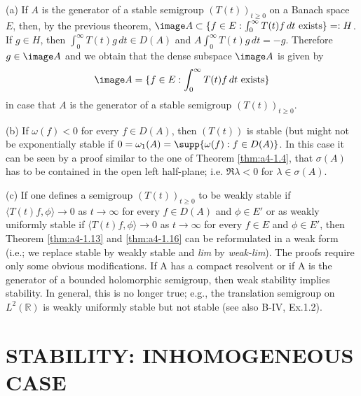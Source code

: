 \begin{remark}\label{rem:a4-1.17}
(a) If $A$ is the generator of a stable semigroup
$(T(t))_{t \geq 0}$ on a Banach space $E$, then, by the previous theorem,
$\image A \subset \{f \in E : \int_{0}^{\infty} T(t)f \, dt \text{ exists}\} =: H$.
If $g \in H$, then $\int_{0}^{\infty} T(t)g \, dt \in D(A)$ and $A \int_{0}^{\infty} T(t)g \, dt = -g$. 
Therefore $g \in \image A$ and we obtain that the dense subspace $\image A$ is given
by
\begin{equation}\label{eq:a4-1.14}
\image A = \{f \in E : \int_{0}^{\infty} T(t)f \, dt \text{ exists}\}
\end{equation}
in case that $A$ is the generator of a stable semigroup $(T(t))_{t \geq 0}$.

\bigskip
\noindent
(b) If $\omega(f) < 0$ for every $f \in D(A)$, then $(T(t))$ is stable (but
might not be exponentially stable if
$0 = \omega_{1}(A) = \supp\{\omega(f) : f \in D(A)\}$. 
In this case it can be seen by a
proof similar to the one of Theorem \ref{thm:a4-1.4}, that $\sigma(A)$ has to be contained
in the open left half-plane; i.e. $\Re \lambda < 0$ for $\lambda \in \sigma(A)$.

\bigskip
\noindent
(c) If one defines a semigroup $(T(t))_{t \geq 0}$ to be weakly stable if
$\langle T(t)f,\phi \rangle \to 0$ as $t \to \infty$ for every $f \in D(A)$ and $\phi \in E'$ or as
weakly uniformly stable if $\langle T(t)f,\phi \rangle \to 0$ as $t \to \infty$ for every $f \in E$
and $\phi \in E'$, then Theorem \ref{thm:a4-1.13} and \ref{thm:a4-1.16} can be reformulated in a weak form (i.e.; we replace stable by weakly stable and \emph{lim} by
\emph{weak-lim}). 
The proofs require only some obvious modifications.
If A has a compact resolvent or if A is the generator of a bounded
holomorphic semigroup, then weak stability implies stability. 
In general, this is no longer true; e.g., the translation semigroup on
$L^{2}(\mathbb{R})$ is weakly uniformly stable but not stable (see also
B-IV, Ex.1.2).
\end{remark}

\section{STABILITY: INHOMOGENEOUS CASE}

